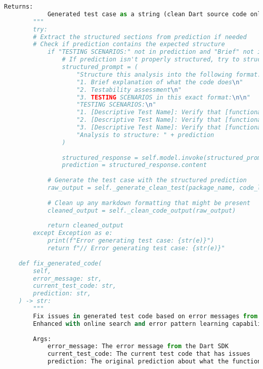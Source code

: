\begin{lstlisting}[language=Python, caption={$\texttt{Test\_Generator}$ class.}, label={lst:14}]
        Returns:
            Generated test case as a string (clean Dart source code only)
        """
        try:
        # Extract the structured sections from prediction if needed
        # Check if prediction contains the expected structure
            if "TESTING SCENARIOS:" not in prediction and "Brief" not in prediction:
                # If prediction isn't properly structured, try to structure it
                structured_prompt = (
                    "Structure this analysis into the following format:\n"
                    "1. Brief explanation of what the code does\n"
                    "2. Testability assessment\n"
                    "3. TESTING SCENARIOS in this exact format:\n\n"
                    "TESTING SCENARIOS:\n"
                    "1. [Descriptive Test Name]: Verify that [functionality]. Input: [specific input values]. Expected: [specific output/behavior].\n"
                    "2. [Descriptive Test Name]: Verify that [functionality]. Input: [specific input values]. Expected: [specific output/behavior].\n"
                    "3. [Descriptive Test Name]: Verify that [functionality]. Input: [specific input values]. Expected: [specific output/behavior].\n\n"
                    "Analysis to structure: " + prediction
                )
                
                structured_response = self.model.invoke(structured_prompt)
                prediction = structured_response.content
            
            # Generate the test case with the structured prediction
            raw_output = self._generate_clean_test(package_name, code_location, function_name_and_arguments, prediction)
            
            # Clean up any markdown formatting that might be present
            cleaned_output = self._clean_code_output(raw_output)
            
            return cleaned_output
        except Exception as e:
            print(f"Error generating test case: {str(e)}")
            return f"// Error generating test case: {str(e)}"
        
    def fix_generated_code(
        self, 
        error_message: str,
        current_test_code: str,
        prediction: str,
    ) -> str:
        """
        Fix issues in generated test code based on error messages from the Dart SDK.
        Enhanced with online search and error pattern learning capabilities.
        
        Args:
            error_message: The error message from the Dart SDK
            current_test_code: The current test code that has issues
            prediction: The original prediction about what the function does
            

\end{lstlisting}

